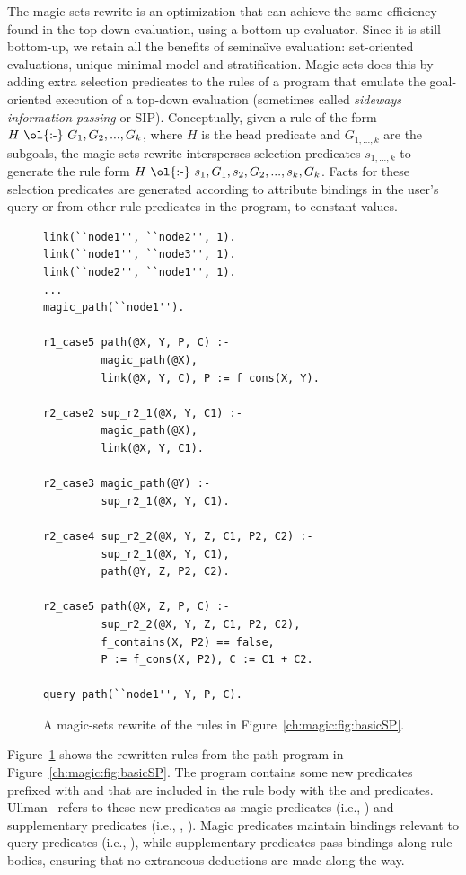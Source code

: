 The magic-sets rewrite is an optimization that can achieve the same
efficiency found in the top-down evaluation, using a bottom-up evaluator.
Since it is still bottom-up, we retain all the benefits of semina\"{\i}ve
evaluation: set-oriented evaluations, unique minimal model and stratification.
Magic-sets does this by adding extra selection predicates to the rules of a
program that emulate the goal-oriented execution of a top-down evaluation
(sometimes called {\em sideways information passing} or SIP).  Conceptually,
given a rule of the form $H\ \text{\ol{:-}}\ G_1, G_2, ..., G_k$, where $H$ is
the head predicate and $G_{1,...,k}$ are the subgoals, the magic-sets rewrite
intersperses selection predicates $s_{1,...,k}$ to generate the rule form $H\
\text{\ol{:-}}\ s_1, G_1, s_2, G_2, ..., s_{k}, G_k$.  Facts for these
selection predicates are generated according to attribute bindings in the
user's query or from other rule predicates in the program, to constant values.

\begin{figure}[!t]
\ssp
\begin{lstlisting}
link(``node1'', ``node2'', 1).
link(``node1'', ``node3'', 1).
link(``node2'', ``node1'', 1).
...
magic_path(``node1'').

r1_case5 path(@X, Y, P, C) :-
         magic_path(@X),
         link(@X, Y, C), P := f_cons(X, Y).

r2_case2 sup_r2_1(@X, Y, C1) :-
         magic_path(@X),
         link(@X, Y, C1).

r2_case3 magic_path(@Y) :-
         sup_r2_1(@X, Y, C1).

r2_case4 sup_r2_2(@X, Y, Z, C1, P2, C2) :-
         sup_r2_1(@X, Y, C1),
         path(@Y, Z, P2, C2).

r2_case5 path(@X, Z, P, C) :-
         sup_r2_2(@X, Y, Z, C1, P2, C2),
         f_contains(X, P2) == false,
         P := f_cons(X, P2), C := C1 + C2.

query path(``node1'', Y, P, C).
\end{lstlisting}
\caption{\label{ch:magic:fig:magicSP}A magic-sets rewrite of 
the rules in Figure~\ref{ch:magic:fig:basicSP}.}
\end{figure}

Figure~\ref{ch:magic:fig:magicSP} shows the rewritten rules from the path
program in Figure~\ref{ch:magic:fig:basicSP}.  The program contains some new
predicates prefixed with \ol{magic\_} and \ol{sup\_} that are included in the
rule body with the \ol{link} and \ol{path} predicates.
Ullman~\cite{ullmanbook} refers to these new predicates as magic predicates
(i.e., \ol{magic\_path}) and supplementary predicates (i.e., \ol{sup\_r2\_1},
\ol{sup\_r2\_2}).  Magic predicates maintain bindings relevant to query
predicates (i.e., \ol{path}), while supplementary predicates pass bindings
along rule bodies, ensuring that no extraneous deductions are made along the
way.

